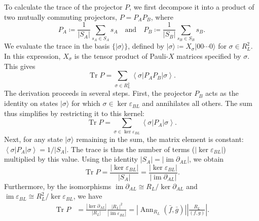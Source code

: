 \documentclass[aps,prb,english,superscriptaddress,twocolumn,tightenlines,showpacs,longbibliography,floatfix,amsfonts]{revtex4-2}
\newcommand{\im}{\operatorname{im}}
\newcommand{\tr}{\operatorname{Tr}}
\begin{document}
To calculate the trace of the projector $P$, we first decompose it into a product of two mutually commuting projectors, $P = P_A P_B$, where
\begin{equation}
    P_{A}\coloneqq\frac{1}{\left|S_{A}\right|}\sum_{s_{A}\in S_{A}}s_{A} \quad \text{and} \quad P_{B}\coloneqq\frac{1}{\left|S_{B}\right|}\sum_{s_{B}\in S_{B}}s_{B}.
\end{equation}
We evaluate the trace in the basis $\{|\sigma\rangle\}$, defined by $|\sigma\rangle \coloneqq X_\sigma |00\cdots 0\rangle$ for $\sigma \in R_L^2$. In this expression, $X_\sigma$ is the tensor product of Pauli-$X$ matrices specified by $\sigma$. This gives 
\begin{equation}
    \tr P=\sum_{\sigma\in R_{L}^{2}}\left\langle \sigma\right|P_{A}P_{B}\left|\sigma\right\rangle.
\end{equation}
The derivation proceeds in several steps. First, the projector $P_B$ acts as the identity on states $|\sigma\rangle$ for which $\sigma\in \ker \varepsilon_{BL}$ and annihilates all others. The sum thus simplifies by restricting it to this kernel:
\begin{equation}
    \tr P=\sum_{\sigma\in\ker\varepsilon_{BL}}\left\langle \sigma\right|P_{A}\left|\sigma\right\rangle .
\end{equation}
Next, for any state $|\sigma\rangle$ remaining in the sum, the matrix element is constant: $\left\langle \sigma\right|P_{A}\left|\sigma\right\rangle =1/\left|S_{A}\right|$. The trace is thus the number of terms ($|\ker\varepsilon_{BL}|$) multiplied by this value. Using the identity $\left|S_{A}\right|=\left|\im \partial_{AL}\right|$, we obtain
\begin{equation}
    \tr P=\frac{\left|\ker\varepsilon_{BL}\right|}{\left|S_{A}\right|}=\frac{\left|\ker\varepsilon_{BL}\right|}{\left|\im \partial_{AL}\right|}.
\end{equation}
Furthermore, by the isomorphisms $\im \partial_{AL} \cong R_L / \ker \partial_{AL}$ and $\im \varepsilon_{BL} \cong R_L^2 / \ker \varepsilon_{BL}$, we have
\begin{equation}
\begin{aligned}
        \tr P &=\frac{\left|\ker \partial_{AL}\right|}{\left|R_{L}\right|}\frac{\left|R_{L}\right|^{2}}{\left|\im \varepsilon_{BL}\right|}=
        \left|\operatorname{Ann}_{R_L}(\bar{f},\bar{g})\right|\left|\frac{R_{L}}{(f,g)}\right|.\label{eq:computeP}
\end{aligned}
\end{equation}
  
\end{document}
